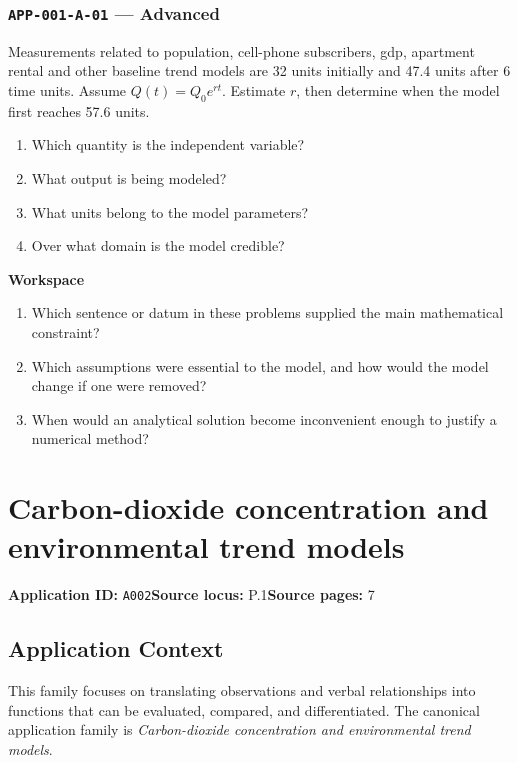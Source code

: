 \documentclass[11pt]{book}
\newcommand{\pid}[1]{\texttt{#1}}
\newcommand{\workspace}{\par\vspace{0.7in}\hrulefill\par\vspace{0.55in}\hrulefill\par}
\begin{document}
\subsection*{\pid{APP-001-A-01} — Advanced}
\begin{problembox}
Measurements related to population, cell-phone subscribers, gdp, apartment rental and other baseline trend models are 32 units initially and 47.4 units after 6 time units. Assume $Q(t)=Q_0e^{rt}$. Estimate $r$, then determine when the model first reaches 57.6 units.
\end{problembox}
\begin{promptbox}\begin{enumerate}
\item Which quantity is the independent variable?
\item What output is being modeled?
\item What units belong to the model parameters?
\item Over what domain is the model credible?
\end{enumerate}\end{promptbox}
\textbf{Workspace}\workspace
\begin{reflectionbox}\begin{enumerate}
\item Which sentence or datum in these problems supplied the main mathematical constraint?
\item Which assumptions were essential to the model, and how would the model change if one were removed?
\item When would an analytical solution become inconvenient enough to justify a numerical method?
\end{enumerate}\end{reflectionbox}
\chapter{Carbon-dioxide concentration and environmental trend models}\label{app:A002}
\textbf{Application ID:} \pid{A002}\quad \textbf{Source locus:} P.1\quad \textbf{Source pages:} 7
\section*{Application Context}
This family focuses on translating observations and verbal relationships into functions that can be evaluated, compared, and differentiated. The canonical application family is \emph{Carbon-dioxide concentration and environmental trend models}.
\end{document}
